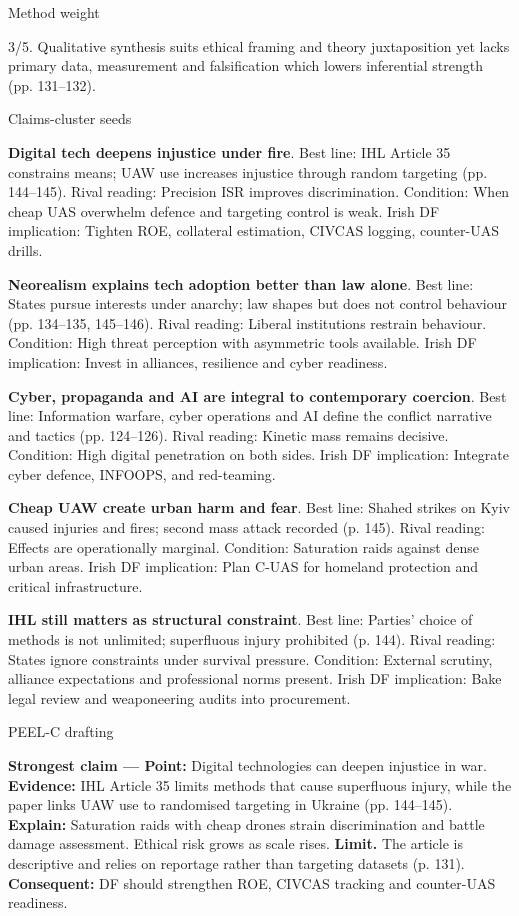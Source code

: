 Method weight

3/5. Qualitative synthesis suits ethical framing and theory juxtaposition yet lacks primary data, measurement and falsification which lowers inferential strength (pp. 131–132).

Claims-cluster seeds

\textbf{Digital tech deepens injustice under fire}.
Best line: IHL Article 35 constrains means; UAW use increases injustice through random targeting (pp. 144–145).
Rival reading: Precision ISR improves discrimination.
Condition: When cheap UAS overwhelm defence and targeting control is weak.
Irish DF implication: Tighten ROE, collateral estimation, CIVCAS logging, counter-UAS drills.

\textbf{Neorealism explains tech adoption better than law alone}.
Best line: States pursue interests under anarchy; law shapes but does not control behaviour (pp. 134–135, 145–146).
Rival reading: Liberal institutions restrain behaviour.
Condition: High threat perception with asymmetric tools available.
Irish DF implication: Invest in alliances, resilience and cyber readiness.

\textbf{Cyber, propaganda and AI are integral to contemporary coercion}.
Best line: Information warfare, cyber operations and AI define the conflict narrative and tactics (pp. 124–126).
Rival reading: Kinetic mass remains decisive.
Condition: High digital penetration on both sides.
Irish DF implication: Integrate cyber defence, INFOOPS, and red-teaming.

\textbf{Cheap UAW create urban harm and fear}.
Best line: Shahed strikes on Kyiv caused injuries and fires; second mass attack recorded (p. 145).
Rival reading: Effects are operationally marginal.
Condition: Saturation raids against dense urban areas.
Irish DF implication: Plan C-UAS for homeland protection and critical infrastructure.

\textbf{IHL still matters as structural constraint}.
Best line: Parties’ choice of methods is not unlimited; superfluous injury prohibited (p. 144).
Rival reading: States ignore constraints under survival pressure.
Condition: External scrutiny, alliance expectations and professional norms present.
Irish DF implication: Bake legal review and weaponeering audits into procurement.

PEEL-C drafting

\textbf{Strongest claim — Point:} Digital technologies can deepen injustice in war.
\textbf{Evidence:} IHL Article 35 limits methods that cause superfluous injury, while the paper links UAW use to randomised targeting in Ukraine (pp. 144–145).
\textbf{Explain:} Saturation raids with cheap drones strain discrimination and battle damage assessment. Ethical risk grows as scale rises.
\textbf{Limit.} The article is descriptive and relies on reportage rather than targeting datasets (p. 131).
\textbf{Consequent:} DF should strengthen ROE, CIVCAS tracking and counter-UAS readiness.


